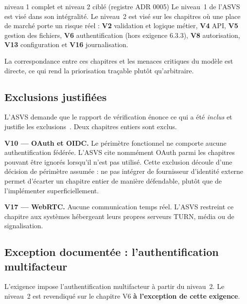 \begin{decision}{niveau 1 complet et niveau 2 ciblé (registre ADR 0005)}
Le niveau~1 de l'ASVS est visé dans son intégralité. Le niveau~2 est visé sur
les chapitres où une place de marché porte un risque réel : \textbf{V2}
validation et logique métier, \textbf{V4} API, \textbf{V5} gestion des
fichiers, \textbf{V6} authentification (hors exigence 6.3.3), \textbf{V8}
autorisation, \textbf{V13} configuration et \textbf{V16} journalisation.

La correspondance entre ces chapitres et les menaces critiques du modèle est
directe, ce qui rend la priorisation traçable plutôt qu'arbitraire.
\end{decision}

\subsection{Exclusions justifiées}

L'ASVS demande que le rapport de vérification énonce ce qui a été \emph{inclus}
et justifie les exclusions~\cite{owaspasvs5}. Deux chapitres entiers sont exclus.

\textbf{V10 --- OAuth et OIDC.} Le périmètre fonctionnel ne comporte aucune
authentification fédérée. L'ASVS cite nommément OAuth parmi les chapitres
pouvant être ignorés lorsqu'il n'est pas utilisé. Cette exclusion découle d'une
décision de périmètre assumée : ne pas intégrer de fournisseur d'identité
externe permet d'écarter un chapitre entier de manière défendable, plutôt que
de l'implémenter superficiellement.

\textbf{V17 --- WebRTC.} Aucune communication temps réel. L'ASVS restreint ce
chapitre aux systèmes hébergeant leurs propres serveurs TURN, média ou de
signalisation.

\subsection{Exception documentée : l'authentification multifacteur}

L'exigence  impose l'authentification multifacteur à partir du
niveau~2. Le niveau~2 est revendiqué sur le chapitre V6 \textbf{à l'exception de
cette exigence}.

